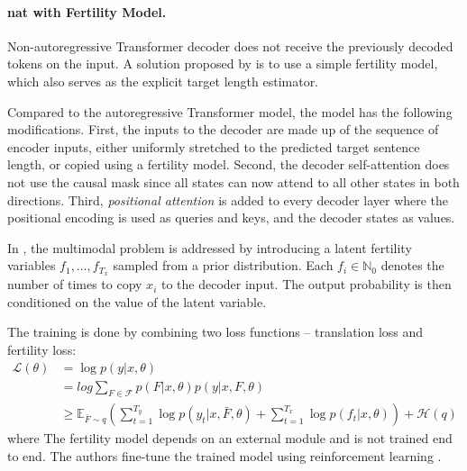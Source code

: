 \paragraph{\Ac{nat} with Fertility Model.} Non-autoregressive Transformer
decoder does not receive the previously decoded tokens on the input. A solution
proposed by \citet{gu2017nonautoregressive} is to use a simple fertility model,
which also serves as the explicit target length estimator.

Compared to the autoregressive Transformer model, the model has the following
modifications. First, the inputs to the decoder are made up of the sequence of
encoder inputs, either uniformly stretched to the predicted target sentence
length, or copied using a fertility model. Second, the decoder self-attention
does not use the causal mask since all states can now attend to all other
states in both directions. Third, \emph{positional attention} is added to every
decoder layer where the positional encoding is used as queries and keys, and
the decoder states as values.

In \citet{gu2017nonautoregressive}, the multimodal problem is addressed by
introducing a latent fertility variables $f_1, \ldots, f_{T_x}$ sampled from a
prior distribution. Each $f_i \in \mathbb{N}_0$ denotes the number of times to
copy $x_i$ to the decoder input. The output probability is then conditioned on
the value of the latent variable.

The training is done by combining two loss functions -- translation loss and
fertility loss:
\begin{align}
  \mathcal{L}(\theta)  & = \log p(y|x, \theta) \\
                       & = log \sum_{F \in \mathcal{F}} p(F| x, \theta ) p(y | x, F, \theta) \\
                       & \geq \mathbb{E}_{\bar{F} \sim q}
                         \left(
                         \sum_{t=1}^{T_y} \log p(y_t | x, \bar{F}, \theta)
                         + \sum_{t=1}^{T_x} \log p(f_t | x, \theta)
                         \right)
                         + \mathcal{H}(q)
\end{align}
%
where 
%
The fertility model depends on an external module and is not trained end to
end. The authors fine-tune the trained model using reinforcement learning
\citep{williams1992simple}.

